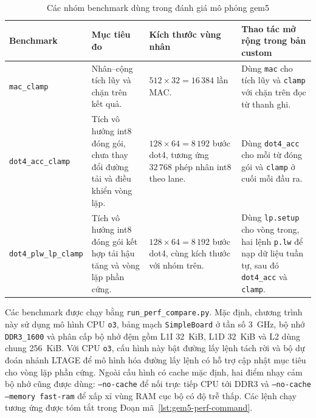 \documentclass[../DoAn.tex]{subfiles}
\begin{document}
\begin{table}[H]
    \centering
    \small
    \setlength{\tabcolsep}{3pt}
    \renewcommand{\arraystretch}{1.18}
    \begin{tabular}{|>{\raggedright\arraybackslash}p{3.35cm}|>{\raggedright\arraybackslash}p{3.20cm}|>{\raggedright\arraybackslash}p{2.85cm}|>{\raggedright\arraybackslash}p{3.65cm}|}
        \hline
        \textbf{Benchmark} & \textbf{Mục tiêu đo} & \textbf{Kích thước vùng nhân} & \textbf{Thao tác mở rộng trong bản custom} \\
        \hline
        \texttt{mac\_clamp} & Nhân--cộng tích lũy và chặn trên kết quả. & \(512 \times 32 = 16\,384\) lần MAC. & Dùng \texttt{mac} cho tích lũy và \texttt{clamp} với chặn trên đọc từ thanh ghi. \\
        \hline
        \texttt{dot4\_acc}\newline\texttt{\_clamp} & Tích vô hướng int8 đóng gói, chưa thay đổi đường tải và điều khiển vòng lặp. & \(128 \times 64 = 8\,192\) bước dot4, tương ứng \(32\,768\) phép nhân int8 theo lane. & Dùng \texttt{dot4\_acc} cho mỗi từ đóng gói và \texttt{clamp} ở cuối mỗi đầu ra. \\
        \hline
        \texttt{dot4\_plw}\newline\texttt{\_lp\_clamp} & Tích vô hướng int8 đóng gói kết hợp tải hậu tăng và vòng lặp phần cứng. & \(128 \times 64 = 8\,192\) bước dot4, cùng kích thước với nhóm trên. & Dùng \texttt{lp.setup} cho vòng trong, hai lệnh \texttt{p.lw} để nạp dữ liệu tuần tự, sau đó \texttt{dot4\_acc} và \texttt{clamp}. \\
        \hline
    \end{tabular}
    \caption{Các nhóm benchmark dùng trong đánh giá mô phỏng gem5}
    \label{tab:gem5-benchmark-groups}
\end{table}

Các benchmark được chạy bằng \texttt{run\_perf\_compare.py}. Mặc định, chương trình này sử dụng mô hình CPU \texttt{o3}, bảng mạch \texttt{SimpleBoard} ở tần số 3~GHz, bộ nhớ \texttt{DDR3\_1600} và phân cấp bộ nhớ đệm gồm L1I 32~KiB, L1D 32~KiB và L2 dùng chung 256~KiB. Với CPU \texttt{o3}, cấu hình này bật đường lấy lệnh tách rời và bộ dự đoán nhánh LTAGE để mô hình hóa đường lấy lệnh có hỗ trợ cập nhật mục tiêu cho vòng lặp phần cứng. Ngoài cấu hình có cache mặc định, hai điểm nhạy cảm bộ nhớ cũng được dùng: \texttt{--no-cache} để nối trực tiếp CPU tới DDR3 và \texttt{--no-cache --memory fast-ram} để xấp xỉ vùng RAM cục bộ có độ trễ thấp. Các lệnh chạy tương ứng được tóm tắt trong Đoạn mã~\ref{lst:gem5-perf-command}.
\end{document}
